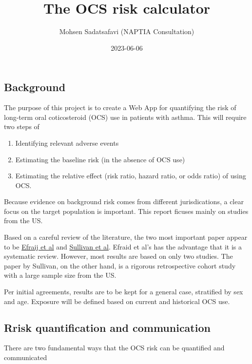 \documentclass[
]{article}
\title{The OCS risk calculator}
\author{Mohsen Sadatsafavi (NAPTIA Consultation)}
\date{2023-06-06}
\begin{document}
\maketitle

\hypertarget{background}{%
\subsection{Background}\label{background}}

The purpose of this project is to create a Web App for quantifying the
risk of long-term oral coticosteroid (OCS) use in patients with asthma.
This will require two steps of

\begin{enumerate}
\def\labelenumi{\arabic{enumi}.}
\item
  Identifying relevant adverse events
\item
  Estimating the baseline risk (in the absence of OCS use)
\item
  Estimating the relative effect (risk ratio, hazard ratio, or odds
  ratio) of using OCS.
\end{enumerate}

Because evidence on background risk comes from different jurisdications,
a clear focus on the target population is important. This report ficuses
mainly on studies from the US.

Based on a careful review of the literature, the two most important
paper appear to be
\href{https://doi.org/10.1080/02770903.2018.1539100}{Efraij et al} and
\href{http://dx.doi.org/10.1016/j.jaci.2017.04.009}{Sullivan et al}.
Efraid et al's has the advantage that it is a systematic review.
However, most results are based on only two studies. The paper by
Sullivan, on the other hand, is a rigorous retrospective cohort study
with a large sample size from the US.

Per initial agreements, results are to be kept for a general case,
stratified by sex and age. Exposure will be defined based on current and
historical OCS use.

\hypertarget{rrisk-quantification-and-communication}{%
\subsection{Rrisk quantification and
communication}\label{rrisk-quantification-and-communication}}

There are two fundamental ways that the OCS risk can be quantified and
communicated
\end{document}
